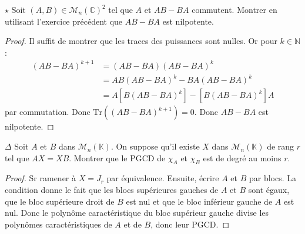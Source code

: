 \documentclass[french,a4paper]{article}
\newcommand{\N}{\mathbb{N}}
\newcommand{\C}{\mathbb{C}}
\newcommand{\K}{\mathbb{K}}
\newcommand{\Tr}{\text{Tr}}
\theoremstyle{plain}
\theoremstyle{definition}
\theoremstyle{remark}
\begin{document}
\begin{ex}{$\star$}
	Soit $(A,B)\in\mathcal{M}_n(\C)^2$ tel que $A$ et $AB-BA$ commutent. Montrer en utilisant l'exercice précédent que $AB-BA$ est nilpotente.
\end{ex}
\begin{proof}
	Il suffit de montrer que les traces des puissances sont nulles. Or pour $k\in\N$ : \begin{align*}
		(AB-BA)^{k+1}&=(AB-BA)(AB-BA)^k\\
		&=AB(AB-BA)^k-BA(AB-BA)^k \\
		&=A\left[B(AB-BA)^k\right]-\left[B(AB-BA)^k\right]A
	\end{align*} par commutation. Donc $\Tr((AB-BA)^{k+1})=0$. Donc $AB-BA$ est nilpotente.
\end{proof}

\begin{ex}{$\Delta$}
	Soit $A$ et $B$ dans $\mathcal{M}_n(\K)$. On suppose qu'il existe $X$ dans $\mathcal{M}_n(\K)$ de rang $r$ tel que $AX=XB$. Montrer que le PGCD de $\chi_A$ et $\chi_B$ est de degré au moins $r$.
\end{ex}
\begin{proof}
	Sr ramener à $X=J_r$ par équivalence. Ensuite, écrire $A$ et $B$ par blocs. La condition donne le fait que les blocs supérieures gauches de $A$ et $B$ sont égaux, que le bloc supérieure droit de $B$ est nul et que le bloc inférieur gauche de $A$ est nul. Donc le polynôme caractéristique du bloc supérieur gauche divise les polynômes caractéristiques de $A$ et de $B$, donc leur PGCD.
\end{proof}
\end{document}
